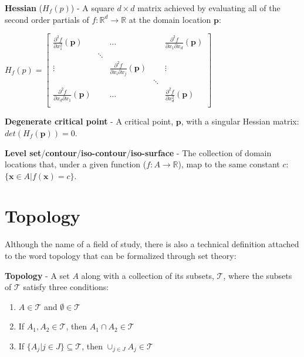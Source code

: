 \begin{defn}
  \textbf{Hessian} ($H_f(p)$) - A square $d\times d$ matrix achieved by evaluating
  all of the second order partials of $f : \mathbb{R}^d \rightarrow \mathbb{R}$ at
  the domain location $\mathbf{p}$:

  $H_f(p) =
  \begin{bmatrix}
    \frac{\partial^2f}{\partial x_1^2}(\mathbf{p}) & & \ldots & & \frac{\partial^2f}{\partial x_1\partial x_d}(\mathbf{p}) \\
     & \ddots &  &  & \\
    \vdots &  & \frac{\partial^2f}{\partial x_i\partial x_j}(\mathbf{p}) &  & \vdots \\
     & &  & \ddots & \\
    \frac{\partial^2f}{\partial x_d\partial x_1}(\mathbf{p}) & & \ldots & & \frac{\partial^2f}{\partial x_d^2}(\mathbf{p}) \\
  \end{bmatrix}$
\end{defn}

\begin{defn}
  \textbf{Degenerate critical point} - A critical point, $\mathbf{p}$, with a
  singular Hessian matrix: $det(H_f(\mathbf{p})) = 0$.
\end{defn}

\begin{defn}
 \textbf{Level set}/\textbf{contour}/\textbf{iso-contour}/\textbf{iso-surface} -
 The collection of domain locations that, under a given function ($f : A
 \rightarrow \mathbb{R}$), map to the same constant $c$: $\{\mathbf{x} \in A |
 f(\mathbf{x}) = c\}$.
\end{defn}

\section{Topology}

Although the name of a field of study, there is also a technical definition attached to the word topology that can be formalized through set theory:

\begin{defn}
  \textbf{Topology} - A set $A$ along with a collection of its subsets,
  $\mathcal{T}$, where the subsets of $\mathcal{T}$ satisfy three conditions:

  \begin{enumerate}
  \item $A \in \mathcal{T}$ and $\emptyset \in \mathcal{T}$
  \item If $A_1,A_2 \in \mathcal{T}$, then $A_1 \cap A_2 \in \mathcal{T}$
  \item If $\{A_j|j\in J\} \subseteq \mathcal{T}$, then $\cup_{j\in J} A_j \in \mathcal{T}$
  \end{enumerate}
\end{defn}

